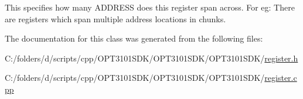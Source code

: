 This specifies how many A\+D\+D\+R\+E\+SS does this register span across. For eg\+: There are registers which span multiple address locations in chunks. 



The documentation for this class was generated from the following files\+:\begin{DoxyCompactItemize}
\item 
C\+:/folders/d/scripts/cpp/\+O\+P\+T3101\+S\+D\+K/\+O\+P\+T3101\+S\+D\+K/\+O\+P\+T3101\+S\+D\+K/\mbox{\hyperlink{register_8h}{register.\+h}}\item 
C\+:/folders/d/scripts/cpp/\+O\+P\+T3101\+S\+D\+K/\+O\+P\+T3101\+S\+D\+K/\+O\+P\+T3101\+S\+D\+K/\mbox{\hyperlink{register_8cpp}{register.\+cpp}}\end{DoxyCompactItemize}
